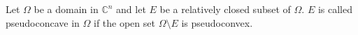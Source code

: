 
Let $\Omega$ be a domain in $\mathbb{C}^n$ and let $E$ be a relatively closed subset of $\Omega$. $E$ is called pseudoconcave in $\Omega$ if the open set $\Omega \setminus E$ is pseudoconvex.
